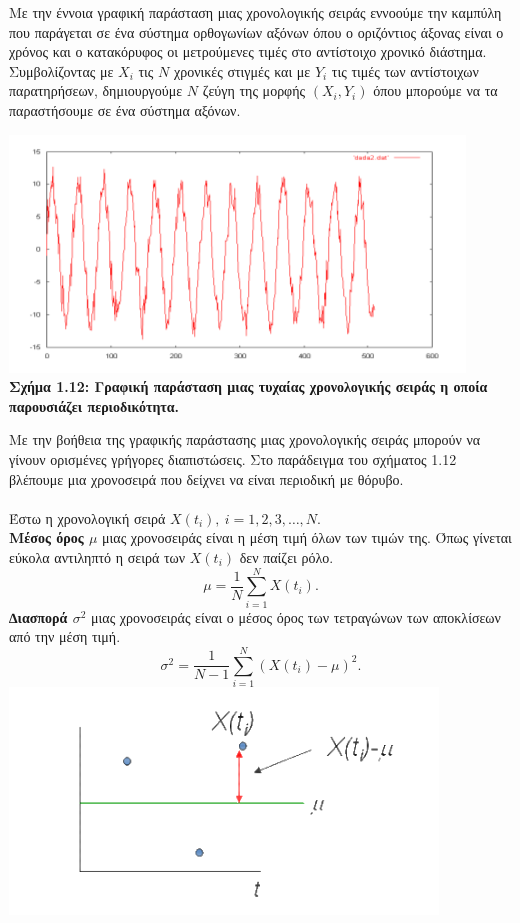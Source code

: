 Με την έννοια γραφική παράσταση μιας χρονολογικής σειράς εννοούμε την
καμπύλη που παράγεται σε ένα σύστημα ορθογωνίων αξόνων όπου ο οριζόντιος
άξονας είναι ο χρόνος και ο κατακόρυφος οι μετρούμενες τιμές στο αντίστοιχο
χρονικό διάστημα. Συμβολίζοντας με $ X_i $ τις $N$ χρονικές στιγμές και με $Y_i$ τις τιμές των
αντίστοιχων παρατηρήσεων, δημιουργούμε $N$ ζεύγη της μορφής $ \left(X_i,Y_i\right)$
όπου
μπορούμε να τα παραστήσουμε σε ένα σύστημα αξόνων.\\
\begin{center}
\includegraphics[scale=0.7]{graf8.png}\\
\textbf{Σχήμα 1.12: Γραφική παράσταση μιας τυχαίας χρονολογικής σειράς η οποία παρουσιάζει
περιοδικότητα. }
\end{center}
Με την βοήθεια της γραφικής παράστασης μιας χρονολογικής σειράς μπορούν
να γίνουν ορισμένες γρήγορες διαπιστώσεις. Στο παράδειγμα του σχήματος 1.12
βλέπουμε μια χρονοσειρά που δείχνει να είναι περιοδική με θόρυβο.\\\\
Έστω η χρονολογική σειρά $X\left(t_i\right),\: i=1,2,3,\ldots,N. $ \\
\textbf{ Μέσος όρος $\mu$} μιας χρονοσειράς είναι η μέση τιμή όλων των τιμών της. Όπως
γίνεται εύκολα αντιληπτό η σειρά των $X\left(t_i\right)$
δεν παίζει ρόλο.\\
$$ \mu=\frac{1}{N} \sum_{i=1}^{N} X\left(t_i\right).$$
\textbf{∆ιασπορά $\sigma^2$}
μιας χρονοσειράς είναι ο μέσος όρος των τετραγώνων των
αποκλίσεων από την μέση τιμή.\\
$$ \sigma^2=\frac{1}{N-1} \sum_{i=1}^{N} \left(X\left(t_i\right)-\mu\right)^2.  $$
\includegraphics[scale=0.6]{graf9.png}\\
